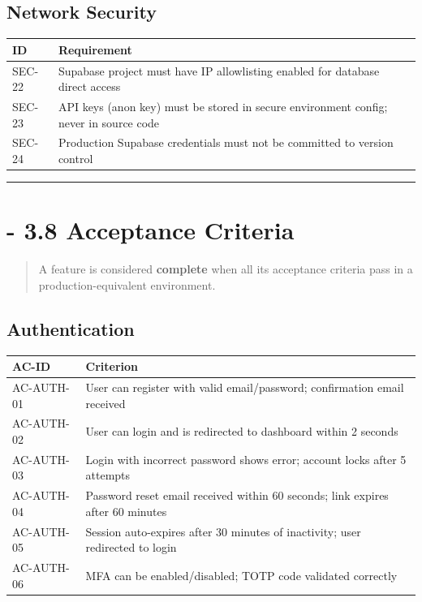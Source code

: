\documentclass[journal, a4paper, onecolumn, 12pt]{IEEEtran}
\begin{document}
\subsection{Network Security}
\begin{longtable}{|p{}|p{}|}
\hline
ID & Requirement \\ \hline
\hline
SEC-22 & Supabase project must have IP allowlisting enabled for database direct access \\ \hline
SEC-23 & API keys (anon key) must be stored in secure environment config; never in source code \\ \hline
SEC-24 & Production Supabase credentials must not be committed to version control \\ \hline
\end{longtable}
\vspace{1em}\hrule\vspace{1em}

\section{    - 3.8 Acceptance Criteria}

\begin{quote}
A feature is considered \textbf{complete} when all its acceptance criteria pass in a production-equivalent environment.
\end{quote}

\subsection{Authentication}
\begin{longtable}{|p{}|p{}|}
\hline
AC-ID & Criterion \\ \hline
\hline
AC-AUTH-01 & User can register with valid email/password; confirmation email received \\ \hline
AC-AUTH-02 & User can login and is redirected to dashboard within 2 seconds \\ \hline
AC-AUTH-03 & Login with incorrect password shows error; account locks after 5 attempts \\ \hline
AC-AUTH-04 & Password reset email received within 60 seconds; link expires after 60 minutes \\ \hline
AC-AUTH-05 & Session auto-expires after 30 minutes of inactivity; user redirected to login \\ \hline
AC-AUTH-06 & MFA can be enabled/disabled; TOTP code validated correctly \\ \hline
\end{longtable}
\end{document}
